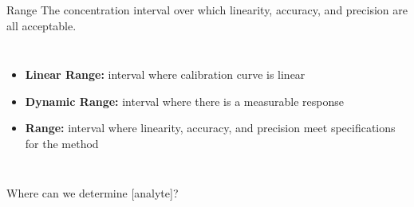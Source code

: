 \documentclass[notes=hide]{beamer}
\begin{document}
\begin{frame}{Range}
	The concentration interval over which linearity, accuracy, and precision
	are all acceptable.

	\begin{columns}
	\begin{itemize}
		\item \textbf{Linear Range:} interval where calibration curve is
			linear
		\item \textbf{Dynamic Range:} interval where there is a
			measurable response
		\item \textbf{Range:} interval where linearity, accuracy, and
			precision meet \alert{specifications} for the method
	\end{itemize}
\end{columns}

\end{frame}

\begin{frame}{Where can we determine [analyte]?}
	\begin{center}

	\end{center}
\end{frame}

\end{document}
